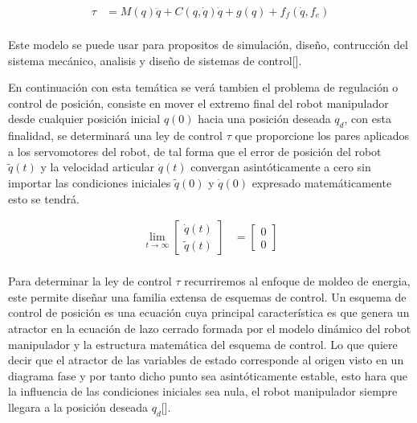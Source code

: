 \documentclass[12pt]{article}
\begin{document}
\begin{equation}
    \begin{split}
        \tau&=M(q)\ddot{q}+C(q,\dot{q})\dot{q}+g(q)+f_f(\dot{q},f_e)\\
    \end{split}
    \label{eq:n_gld}
\end{equation}

Este modelo se puede usar para propositos de simulación, diseño, contrucción del sistema mecánico, analisis y diseño de sistemas de control[\cite{reyes2011robotica}]. 

En continuación con esta temática se verá tambien el problema de regulación o control de posición, consiste en mover el extremo final del robot manipulador desde cualquier posición inicial $q(0)$ hacia una posición deseada $q_d$, con esta finalidad, se determinará una ley de control $\tau$ que proporcione los pares aplicados a los servomotores del robot, de tal forma que el error de posición del robot $\tilde{q}(t)$ y la velocidad articular $\dot{q}(t)$ convergan asintóticamente a cero sin importar las condiciones iniciales $\tilde{q}(0)$ y $\dot{q}(0)$ expresado matemáticamente esto se tendrá.

\begin{equation}
    \begin{split}
        \lim_{t\rightarrow\infty}
        \begin{bmatrix}
            \dot{q}(t)\\
            \tilde{q}(t)
        \end{bmatrix}&=
        \begin{bmatrix}
            0\\
            0
        \end{bmatrix}\\
    \end{split}
    \label{eq:lim_cerrado}
\end{equation}

Para determinar la ley de control $\tau$ recurriremos al enfoque de moldeo de energia, este permite diseñar una familia extensa de esquemas de control. Un esquema de control de posición es una ecuación cuya principal característica es  que genera un atractor en la ecuación de lazo cerrado formada por el modelo dinámico del robot manipulador y la estructura matemática del esquema de control. Lo que quiere decir que el atractor de las variables de estado corresponde al origen visto en un diagrama fase y por tanto dicho punto sea asintóticamente estable, esto hara que la influencia de las condiciones iniciales sea nula, el robot manipulador siempre llegara a la posición deseada $q_d$[\cite{reyes2011robotica}]. 
\end{document}
